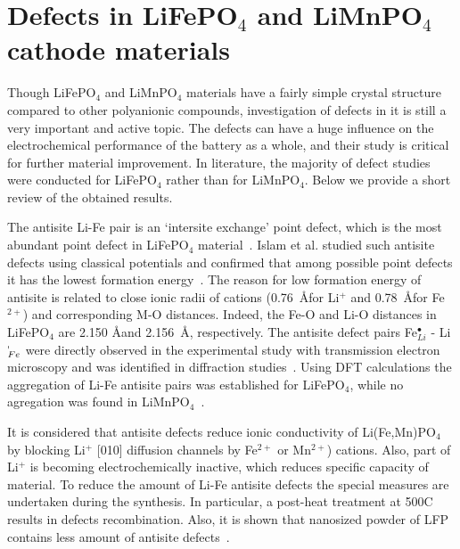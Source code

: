 \section{Defects in LiFePO$_4$ and LiMnPO$_4$ cathode materials}

Though LiFePO$_4$ and LiMnPO$_4$ materials have a fairly simple crystal structure compared to other polyanionic compounds, investigation of defects in it is still a very important and active topic. The defects can have a huge influence on the electrochemical performance of the battery as a whole, and their study is critical for further material improvement. In literature, the majority of defect studies were conducted for LiFePO$_4$ rather than for LiMnPO$_4$. Below we provide a short review of the obtained results.

The antisite Li-Fe pair is an ‘intersite exchange’ point defect,  which is the most abundant point defect in LiFePO$_4$ material~\cite{islam2005atomic}. Islam et al. studied such antisite defects  using classical potentials and confirmed that among possible point defects it has the lowest formation energy~\cite{islam2005atomic}.
The reason for low formation energy of antisite is related to close ionic radii of cations (0.76~\AA for Li$^+$ and 0.78~\AA for Fe$^{2+}$) and corresponding M-O distances. Indeed, the Fe-O and Li-O distances in LiFePO$_4$ are 2.150 \AA and 2.156~\AA, respectively. The antisite defect pairs Fe$^{\bullet}_{Li}$ - Li$^{\mapstochar}_{Fe}$ were directly observed in the experimental study with transmission electron microscopy  \cite{paolella2015cation, chung2008atomic} and was identified in diffraction studies~\cite{chen2011situ}. Using DFT calculations the aggregation of Li-Fe antisite pairs was established for LiFePO$_4$, while no agregation was found in LiMnPO$_4$~\cite{chung2012distinct}. 

It is considered that antisite defects reduce ionic conductivity of Li(Fe,Mn)PO$_4$ by blocking Li$^+$ [010] diffusion channels by Fe$^{2+}$ or Mn$^{2+}$) cations. Also, part of Li$^+$ is becoming  electrochemically inactive, which reduces specific capacity of material. To reduce the amount of Li-Fe antisite defects the special measures are undertaken during the synthesis. In particular, a post-heat treatment at 500\textdegree C~\cite{chen2011study} results in defects recombination. Also, it is shown that nanosized powder of LFP contains less amount of antisite defects~\cite{jensen2013defects}.

